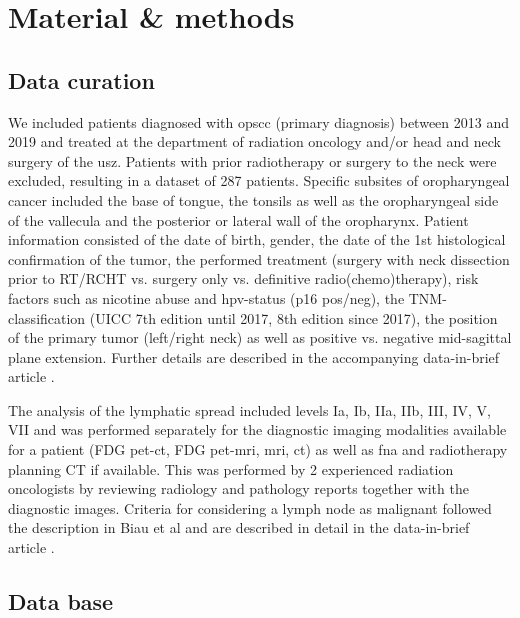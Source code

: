 \documentclass[\relativeRoot/main.tex]{subfiles}
\begin{document}
\section{Material & methods}
\label{sec:material}

\subsection{Data curation}
\label{subsec:material:curation}

We included patients diagnosed with \gls{opscc} (primary diagnosis) between 2013 and 2019 and treated at the department of radiation oncology and/or head and neck surgery of the \gls{usz}. Patients with prior radiotherapy or surgery to the neck were excluded, resulting in a dataset of 287 patients. Specific subsites of oropharyngeal cancer included the base of tongue, the tonsils as well as the oropharyngeal side of the vallecula and the posterior or lateral wall of the oropharynx. Patient information consisted of the date of birth, gender, the date of the 1st histological confirmation of the tumor, the performed treatment (surgery with neck dissection prior to RT/RCHT vs. surgery only vs. definitive radio(chemo)therapy), risk factors such as nicotine abuse and \gls{hpv}-status (p16 pos/neg), the TNM-classification (UICC 7th edition until 2017, 8th edition since 2017), the position of the primary tumor (left/right neck) as well as positive vs. negative mid-sagittal plane extension. Further details are described in the accompanying data-in-brief article \cite{ludwig_dataset_2021}.

The analysis of the lymphatic spread included levels Ia, Ib, IIa, IIb, III, IV, V, VII and was performed separately for the diagnostic imaging modalities available for a patient (FDG \gls{pet}-\gls{ct}, FDG \gls{pet}-\gls{mri}, \gls{mri}, \gls{ct}) as well as \gls{fna} and radiotherapy planning CT if available. This was performed by 2 experienced radiation oncologists by reviewing radiology and pathology reports together with the diagnostic images. Criteria for considering a lymph node as malignant followed the description in Biau et al \cite{biau_selection_2019} and are described in detail in the data-in-brief article \cite{ludwig_dataset_2021}.

\subsection{Data base}
\end{document}
